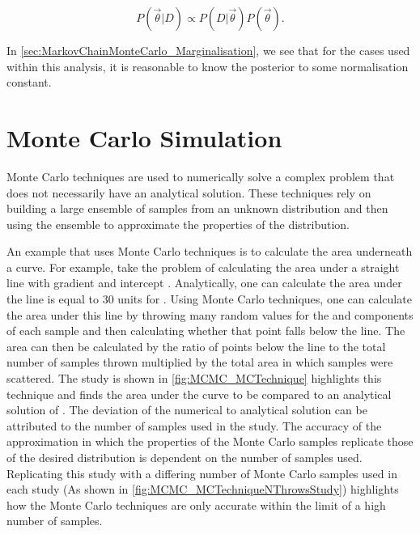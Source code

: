 \begin{equation}
  \label{eq:MarkovChainMonteCarlo_PosteriorDistributionReduced}
  P(\vec{\theta}|D) \propto P(D|\vec{\theta}) P(\vec{\theta}).
\end{equation}

In \autoref{sec:MarkovChainMonteCarlo_Marginalisation}, we see that for the cases used within this analysis, it is reasonable to know the posterior to some normalisation constant.

\section{Monte Carlo Simulation}
\label{sec:MarkovChainMonteCarlo_MonteCarloSimulation}
Monte Carlo techniques are used to numerically solve a complex problem that does not necessarily have an analytical solution. These techniques rely on building a large ensemble of samples from an unknown distribution and then using the ensemble to approximate the properties of the distribution.

An example that uses Monte Carlo techniques is to calculate the area underneath a curve. For example, take the problem of calculating the area under a straight line with gradient  and intercept . Analytically, one can calculate the area under the line is equal to 30 units for . Using Monte Carlo techniques, one can calculate the area under this line by throwing many random values for the  and  components of each sample and then calculating whether that point falls below the line. The area can then be calculated by the ratio of points below the line to the total number of samples thrown multiplied by the total area in which samples were scattered. The study is shown in \autoref{fig:MCMC_MCTechnique} highlights this technique and finds the area under the curve to be  compared to an analytical solution of . The deviation of the numerical to analytical solution can be attributed to the number of samples used in the study. The accuracy of the approximation in which the properties of the Monte Carlo samples replicate those of the desired distribution is dependent on the number of samples used. Replicating this study with a differing number of Monte Carlo samples used in each study (As shown in \autoref{fig:MCMC_MCTechniqueNThrowsStudy}) highlights how the Monte Carlo techniques are only accurate within the limit of a high number of samples.

